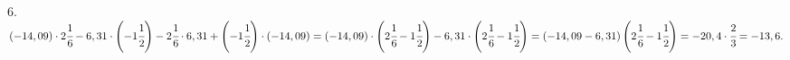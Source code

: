 6. $(-14,09)\cdot 2\cfrac{1}{6}-6,31\cdot\left (-1\cfrac{1}{2}\right )-2\cfrac{1}{6}\cdot6,31+\left(-1\cfrac{1}{2}\right)\cdot(-14,09)=
(-14,09)\cdot\left(2\cfrac{1}{6}-1\cfrac{1}{2}\right)-6,31\cdot\left(2\cfrac{1}{6}-1\cfrac{1}{2}\right)=
(-14,09-6,31)\left(2\cfrac{1}{6}-1\cfrac{1}{2}\right)=-20,4\cdot\cfrac{2}{3}=-13,6.$\\
